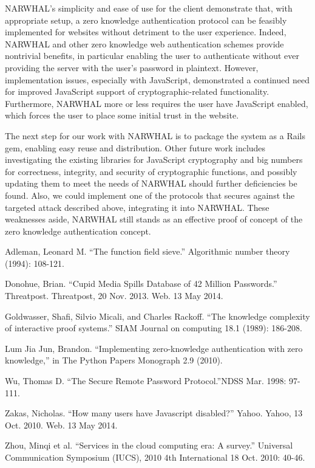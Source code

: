 \documentclass[11pt]{article}
\begin{document}
NARWHAL's simplicity and ease of use for the client demonstrate that, with appropriate setup, a zero knowledge authentication protocol can be feasibly implemented for websites without detriment to the user experience.  Indeed, NARWHAL and other zero knowledge web authentication schemes provide nontrivial benefits, in particular enabling the user to authenticate without ever providing the server with the user's password in plaintext.  However, implementation issues, especially with JavaScript, demonstrated a continued need for improved JavaScript support of cryptographic-related functionality.  Furthermore, NARWHAL more or less requires the user have JavaScript enabled, which forces the user to place some initial trust in the website.

The next step for our work with NARWHAL is to package the system as a Rails gem, enabling easy reuse and distribution.  Other future work includes investigating the existing libraries for JavaScript cryptography and big numbers for correctness, integrity, and security of cryptographic functions, and possibly updating them to meet the needs of NARWHAL should further deficiencies be found.  Also, we could implement one of the protocols that secures against the targeted attack described above, integrating it into NARWHAL. These weaknesses aside, NARWHAL still stands as an effective proof of concept of the zero knowledge authentication concept.

\begin{thebibliography}{9}
Adleman, Leonard M. ``The function field sieve.'' Algorithmic number theory (1994): 108-121.

Donohue, Brian. ``Cupid Media Spills Database of 42 Million Passwords.'' Threatpost. Threatpost, 20 Nov. 2013. Web. 13 May 2014.

Goldwasser, Shafi, Silvio Micali, and Charles Rackoff. ``The knowledge complexity of interactive proof systems.'' SIAM Journal on computing 18.1 (1989): 186-208.

Lum Jia Jun, Brandon. ``Implementing zero-knowledge authentication with zero knowledge,'' in The Python Papers Monograph 2.9 (2010).

Wu, Thomas D. ``The Secure Remote Password Protocol.''NDSS Mar. 1998: 97-111.

Zakas, Nicholas. ``How many users have Javascript disabled?'' Yahoo. Yahoo, 13 Oct. 2010. Web. 13 May 2014.

Zhou, Minqi et al. ``Services in the cloud computing era: A survey.'' Universal Communication Symposium (IUCS), 2010 4th International 18 Oct. 2010: 40-46.

\end{thebibliography}
\end{document}
